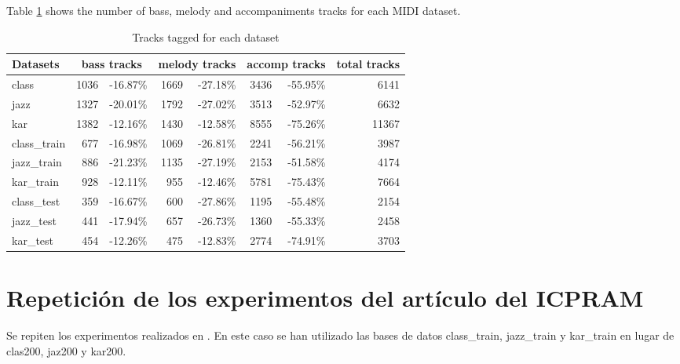 \documentclass{article}
\begin{document}
Table \ref{table2} shows the number of bass, melody and accompaniments tracks for each MIDI dataset.


\begin{table}
\begin{center}
\begin{tabular}{ l | r   r | r   r | r   r | r }
\hline
Datasets & \multicolumn{2}{|c|}{bass tracks} & \multicolumn{2}{|c|}{melody tracks} & \multicolumn{2}{|c|}{accomp tracks } & total tracks \\
\hline
\hline
class & 1036 & -16.87\% & 1669 & -27.18\% & 3436 & -55.95\% & 6141 \\
jazz & 1327 & -20.01\% & 1792 & -27.02\% & 3513 & -52.97\% & 6632 \\
kar & 1382 & -12.16\% & 1430 & -12.58\% & 8555 & -75.26\% & 11367 \\
\hline
class\_train & 677 & -16.98\% & 1069 & -26.81\% & 2241 & -56.21\% & 3987 \\
jazz\_train & 886 & -21.23\% & 1135 & -27.19\% & 2153 & -51.58\% & 4174 \\
kar\_train & 928 & -12.11\% & 955 & -12.46\% & 5781 & -75.43\% & 7664 \\
\hline
class\_test & 359 & -16.67\% & 600 & -27.86\% & 1195 & -55.48\% & 2154 \\
jazz\_test & 441 & -17.94\% & 657 & -26.73\% & 1360 & -55.33\% & 2458 \\
kar\_test & 454 & -12.26\% & 475 & -12.83\% & 2774 & -74.91\% & 3703 \\
\hline
\end{tabular}
\caption{Tracks tagged for each dataset}
\label{table2}
\end{center}
\end{table}










\section{Repetición de los experimentos del artículo del ICPRAM}

Se repiten los experimentos realizados en \cite{vicente2012bass}. En este caso se han utilizado las bases de datos class\_train, jazz\_train y kar\_train en lugar de clas200, jaz200 y kar200.
\end{document}
